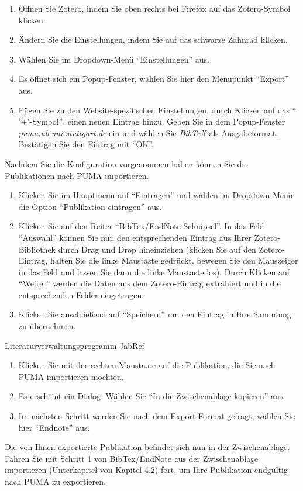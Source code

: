 \documentclass[a4paper,11pt,twoside]{scrbook}
\begin{document}
\begin{enumerate}
    \item Öffnen Sie Zotero, indem Sie oben rechts bei Firefox auf das Zotero-Symbol klicken.
    \item Ändern Sie die Einstellungen, indem Sie auf das schwarze Zahnrad klicken. 
    \item Wählen Sie im Dropdown-Menü \enquote{Einstellungen} aus.
    \item Es öffnet sich ein Popup-Fenster, wählen Sie hier den Menüpunkt \enquote{Export} aus. 
    \item Fügen Sie zu den Website-spezifischen Einstellungen, durch Klicken auf das \enquote{ '+'-Symbol}, einen neuen Eintrag hinzu. Geben Sie in dem Popup-Fenster \textit{puma.ub.uni-stuttgart.de} ein und wählen Sie \textit{BibTeX} als Ausgabeformat. Bestätigen Sie den Eintrag mit \enquote{OK}. 
\end{enumerate}
Nachdem Sie die Konfiguration vorgenommen haben können Sie die Publikationen nach PUMA importieren. 
\begin{enumerate}
    \item Klicken Sie im Hauptmenü auf \enquote{Eintragen} und wählen im Dropdown-Menü die Option \enquote{Publikation eintragen} aus.  
    \item Klicken Sie auf den Reiter \enquote{BibTex/EndNote-Schnipsel}. In das Feld \enquote{Auswahl} können Sie nun den entsprechenden Eintrag aus Ihrer Zotero-Bibliothek durch Drag und Drop hineinziehen (klicken Sie auf den Zotero-Eintrag, halten Sie die linke Maustaste gedrückt, bewegen Sie den Mauszeiger in das Feld und lassen Sie dann die linke Maustaste los). Durch Klicken auf \enquote{Weiter} werden die Daten aus dem Zotero-Eintrag extrahiert und in die entsprechenden Felder eingetragen. 
    \item Klicken Sie anschließend auf \enquote{Speichern} um den Eintrag in Ihre Sammlung zu übernehmen.
\end{enumerate}  
Literaturverwaltungsprogramm JabRef
\begin{enumerate}
    \item Klicken Sie mit der rechten Maustaste auf die Publikation, die Sie nach PUMA importieren möchten.
    \item Es erscheint ein Dialog. Wählen Sie \enquote{In die Zwischenablage kopieren} aus.
    \item Im nächsten Schritt werden Sie nach dem Export-Format gefragt, wählen Sie hier \enquote{Endnote} aus.
\end{enumerate}
Die von Ihnen exportierte Publikation befindet sich nun in der Zwischenablage. Fahren Sie mit Schritt 1 von BibTex/EndNote aus der Zwischenablage importieren (Unterkapitel von Kapitel 4.2) fort, um Ihre Publikation endgültig nach PUMA zu exportieren.
\end{document}
